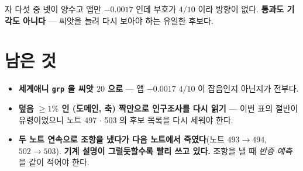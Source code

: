 \documentclass[11pt]{article}
\begin{document}
자 다섯 중 넷이 양수고 앱만 $-0.0017$ 인데 부호가 $4/10$ 이라 방향이
없다. \textbf{통과도 기각도 아니다} --- 씨앗을 늘려 다시 보아야 하는
유일한 후보다.

\section*{남은 것}

\begin{itemize}
\item \textbf{세계애니 \texttt{grp} 을 씨앗 $20$ 으로} --- 앱 $-0.0017$
$4/10$ 이 잡음인지 아닌지가 전부다.
\item \textbf{덮음 $\geq 1\%$ 인 (도메인, 축) 짝만으로 인구조사를 다시
읽기} --- 이번 표의 절반이 유령이었으니 노트 497 $\cdot$ 503 의 후보
목록을 다시 세워야 한다.
\item \textbf{두 노트 연속으로 조항을 냈다가 다음 노트에서 죽였다}(노트
$493 \to 494$, $502 \to 503$). \textbf{기계 설명이 그럴듯할수록 빨리
쓰고 있다.} 조항을 낼 때 \emph{반증 예측}을 같이 적어야 한다.
\end{itemize}
\end{document}
